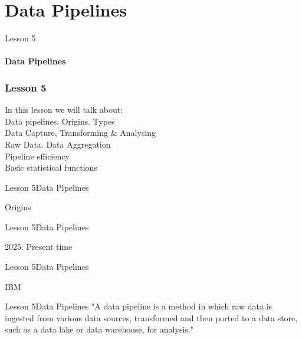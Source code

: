 \documentclass[aspectratio=1610]{beamer}
\begin{document}
\section{Data Pipelines}

\begin{frame}
\begin{center}
\Huge Lesson 5\\~\\
\textbf{Data Pipelines}
\end{center}
\end{frame}


\begin{frame}
\frametitle{Lesson 5}
\Huge In this lesson we will talk about:\\
\huge
 \alert{Data pipelines. Origins. Types}\\
 \alert{Data Capture, Transforming \& Analysing}\\
 \alert{Raw Data. Data Aggregation}\\
 \alert{Pipeline efficiency}\\
 \alert{Basic statistical functions}
\end{frame}


\begin{frame}{Lesson 5}{Data Pipelines}
\Huge
\begin{center}
Origins
\end{center}
\end{frame}


\begin{frame}{Lesson 5}{Data Pipelines}
\Huge
\begin{center}
2025. Present time 
\end{center}
\end{frame}



\begin{frame}{Lesson 5}{Data Pipelines}
\Huge
\begin{center}
 IBM
\end{center}
\end{frame}

\begin{frame}{Lesson 5}{Data Pipelines}
\LARGE
"A data pipeline is a method in which raw data is ingested from 
various data sources, transformed and then ported to a data store, 
such as a data lake or data warehouse, for analysis."
\end{frame}
\end{document}
